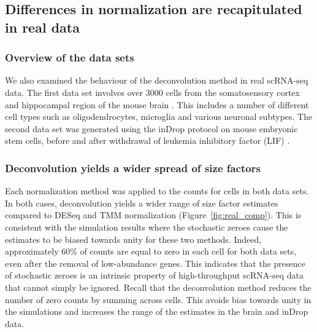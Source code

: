 \documentclass{bmcart}
\begin{document}
\subsection*{Differences in normalization are recapitulated in real data}

\subsubsection*{Overview of the data sets}
We also examined the behaviour of the deconvolution method in real scRNA-seq data.
The first data set involves over 3000 cells from the somatosensory cortex and hippocampal region of the mouse brain \cite{zeisel2015brain}.
This includes a number of different cell types such as oligodendrocytes, microglia and various neuronal subtypes.
The second data set was generated using the inDrop protocol on mouse embryonic stem cells, before and after withdrawal of leukemia inhibitory factor (LIF) \cite{klein2015droplet}.

\subsubsection*{Deconvolution yields a wider spread of size factors}
Each normalization method was applied to the counts for cells in both data sets.
In both cases, deconvolution yields a wider range of size factor estimates compared to DESeq and TMM normalization (Figure~\ref{fig:real_comp}).
This is consistent with the simulation results where the stochastic zeroes cause the estimates to be biased towards unity for these two methods.
Indeed, approximately 60\% of counts are equal to zero in each cell for both data sets, even after the removal of low-abundance genes.
This indicates that the presence of stochastic zeroes is an intrinsic property of high-throughput scRNA-seq data that cannot simply be ignored.
Recall that the deconvolution method reduces the number of zero counts by summing across cells.
This avoids bias towards unity in the simulations and increases the range of the estimates in the brain and inDrop data.
\end{document}
